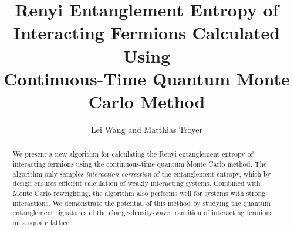 \documentclass[12pt,onecolumn,english,prl,showpacs,nofootinbib]{revtex4-1}
\begin{document}
\title{Renyi Entanglement Entropy of Interacting Fermions Calculated Using \\Continuous-Time Quantum Monte Carlo Method}

\author{Lei Wang and Matthias Troyer}

\begin{abstract}
We present a new algorithm for calculating the Renyi entanglement entropy of interacting fermions using the continuous-time quantum Monte Carlo method. The algorithm only samples  \emph{interaction correction} of the entanglement entropy, which by design ensures efficient calculation of  weakly interacting systems. Combined with Monte Carlo reweighting, the algorithm also performs well for systems with strong interactions. We demonstrate the potential of this method by studying the quantum entanglement signatures of the charge-density-wave transition of interacting fermions on a square lattice.  
\end{abstract}



\maketitle

\pagestyle{plain}
\end{document}
